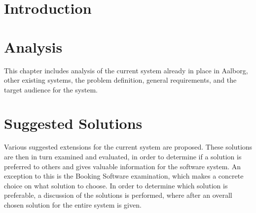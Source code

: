 
\usepackage[disable]{todonotes}					%
\usepackage[draft]{fixme}
\newcommand{\bycykelwithoutspace}{Aalborg Bycykel}
\newcommand{\bycykel}{\bycykelwithoutspace{ }}



	\BgThispage
	
	\clearpage
	\newpage\null\thispagestyle{empty}
	
	\addtocounter{page}{4}
	
	\newpage\null\thispagestyle{empty}\newpage
	\label{startoftoc}
	\begin{KeepFromToc}
		\tableofcontents
		\newpage\null\thispagestyle{empty}\newpage
		\todototoc
		\listoftodos
	\end{KeepFromToc}
	\label{endoftoc}
	
	\chapter{Introduction}
	
	\chapter{Analysis}
	This chapter includes analysis of the current system already in place in Aalborg, other existing systems, the problem definition, general requirements, and the target audience for the system.
	
	
	
	
	
	
	\chapter{Suggested Solutions}
	Various suggested extensions for the current system are proposed.
	These solutions are then in turn examined and evaluated, in order to determine if a solution is preferred to others and gives valuable information for the software system.
	An exception to this is the Booking Software examination, which makes a concrete choice on what solution to choose. 
	In order to determine which solution is preferable, a discussion of the solutions is performed, where after an overall chosen solution for the entire system is given.
	
	
	
	
	
	
